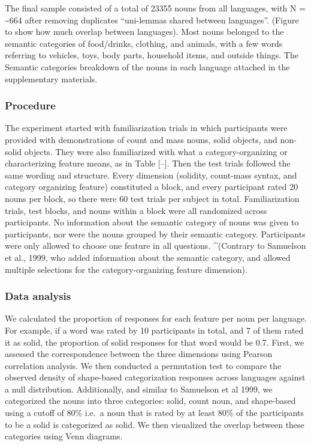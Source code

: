 \documentclass[
  american,
  man,floatsintext]{apa6}
\begin{document}
The final sample consisted of a total of 23355 nouns from all languages, with N = \textasciitilde664 after removing duplicates ``uni-lemmas shared between languages''. (Figure to show how much overlap between languages). Most nouns belonged to the semantic categories of food/drinks, clothing, and animals, with a few words referring to vehicles, toys, body parts, household items, and outside things. The Semantic categories breakdown of the nouns in each language attached in the supplementary materials.

\subsubsection{Procedure}\label{procedure}

The experiment started with familiarization trials in which participants were provided with demonstrations of count and mass nouns, solid objects, and non-solid objects. They were also familiarized with what a category-organizing or characterizing feature means, as in Table {[}--{]}. Then the test trials followed the same wording and structure. Every dimension (solidity, count-mass syntax, and category organizing feature) constituted a block, and every participant rated 20 nouns per block, so there were 60 test trials per subject in total. Familiarization trials, test blocks, and nouns within a block were all randomized across participants. No information about the semantic category of nouns was given to participants, nor were the nouns grouped by their semantic category. Participants were only allowed to choose one feature in all questions.
\^{}(Contrary to Samuelson et al., 1999, who added information about the semantic category, and allowed multiple selections for the category-organizing feature dimension).

\subsubsection{Data analysis}\label{data-analysis}

We calculated the proportion of responses for each feature per noun per language. For example, if a word was rated by 10 participants in total, and 7 of them rated it as solid, the proportion of solid responses for that word would be 0.7. First, we assessed the correspondence between the three dimensions using Pearson correlation analysis. We then conducted a permutation test to compare the observed density of shape-based categorization responses across languages against a null distribution.
Additionally, and similar to Samuelson et al 1999, we categorized the nouns into three categories: solid, count noun, and shape-based using a cutoff of 80\% i.e.~a noun that is rated by at least 80\% of the participants to be a solid is categorized as solid. We then visualized the overlap between these categories using Venn diagrams.
\end{document}
